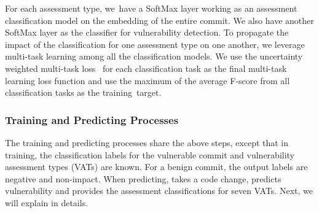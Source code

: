 For each assessment type, we~have a SoftMax layer working as an
assessment classification model on the embedding of the entire commit.
We also have another SoftMax layer as the classifier for
vulnerability detection.
%
%
To propagate the impact of the classification for one assessment type
on one another, we leverage multi-task learning among all the
classification models. We use the uncertainty weighted multi-task
loss~\cite{kendall2018multi} for each classification task as the final
multi-task learning loss function and use the maximum of the average
F-score from all classification tasks as the
training~target.




\subsubsection*{{\bf Training and Predicting Processes}}
The training and predicting processes share the above steps, except
that in training, the classification labels for the vulnerable commit
and vulnerability assessment types (VATs) are known. For a benign
commit, the output labels are negative and non-impact.
When predicting, {\tool} takes a code change, predicts
vulnerability and provides the assessment classifications for seven
VATs. Next, we will explain {\tool} in details.



